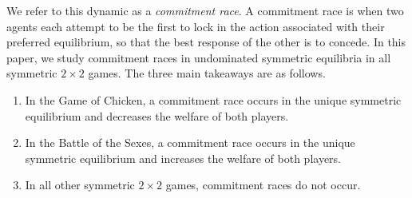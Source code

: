 \documentclass[letterpaper]{article}
\newcommand{\TinfCommitProbStraightFirstPeriod}{0.18}
\newcommand{\TinfCrashInFirstPeriodPercentage}{3}
\theoremstyle{definition}
\begin{document}
% 

We refer to this dynamic as a \textit{commitment race}. A commitment race is when two agents each attempt to be the first to lock in the action associated with their preferred equilibrium, so that the best response of the other is to concede. 
In this paper, we study commitment races in undominated symmetric equilibria in all symmetric $2\times2$ games. The three main takeaways are as follows.
\begin{enumerate}
    \item In the Game of Chicken, a commitment race occurs in the unique symmetric equilibrium and decreases the welfare of both players.
    \item In the Battle of the Sexes, a commitment race occurs in the unique symmetric equilibrium and increases the welfare of both players.
    \item In all other symmetric $2\times2$ games, commitment races do not occur.
\end{enumerate}
\end{document}
